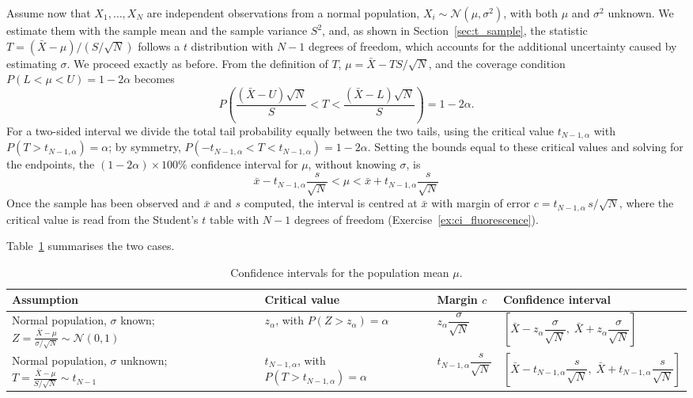 \documentclass[letterpaper,11pt,leqno]{book}
\begin{document}
Assume now that $X_1, \dots, X_N$ are independent observations from a normal population, $X_i \sim \mathcal{N}(\mu, \sigma^2)$, with both $\mu$ and $\sigma^2$ unknown. We estimate them with the sample mean and the sample variance $S^2$, and, as shown in Section~\ref{sec:t_sample}, the statistic $T = (\bar{X} - \mu)/(S/\sqrt{N})$ follows a $t$ distribution with $N - 1$ degrees of freedom, which accounts for the additional uncertainty caused by estimating $\sigma$. We proceed exactly as before. From the definition of $T$, $\mu = \bar{X} - TS/\sqrt{N}$, and the coverage condition $P(L < \mu < U) = 1 - 2\alpha$ becomes
\begin{equation*}
P\left(\frac{(\bar{X} - U)\sqrt{N}}{S} < T < \frac{(\bar{X} - L)\sqrt{N}}{S}\right) = 1 - 2\alpha.
\end{equation*}
For a two-sided interval we divide the total tail probability equally between the two tails, using the critical value $t_{N-1,\alpha}$ with $P(T > t_{N-1,\alpha}) = \alpha$; by symmetry, $P(-t_{N-1,\alpha} < T < t_{N-1,\alpha}) = 1 - 2\alpha$. Setting the bounds equal to these critical values and solving for the endpoints, the $(1 - 2\alpha) \times 100\%$ confidence interval for $\mu$, without knowing $\sigma$, is
\begin{equation}
\boxed{\bar{x} - t_{N-1,\alpha}\frac{s}{\sqrt{N}} < \mu < \bar{x} + t_{N-1,\alpha}\frac{s}{\sqrt{N}}}
\label{eq:ci_unknown_sigma}
\end{equation}
Once the sample has been observed and $\bar{x}$ and $s$ computed, the interval is centred at $\bar{x}$ with margin of error $c = t_{N-1,\alpha}\,s/\sqrt{N}$, where the critical value is read from the Student's $t$ table with $N - 1$ degrees of freedom (Exercise~\ref{ex:ci_fluorescence}).

Table~\ref{tab:ci_summary} summarises the two cases.

\begin{table}[!htbp]
\centering
\caption{Confidence intervals for the population mean $\mu$.}
\label{tab:ci_summary}
\begin{tabular*}{\textwidth}{p{3.9cm}@{\extracolsep\fill}p{2.9cm}p{1.9cm}p{4.3cm}}
\toprule
Assumption & Critical value & Margin $c$ & Confidence interval \\
\midrule
Normal population, $\sigma$ known; $Z = \frac{\bar{X} - \mu}{\sigma/\sqrt{N}} \sim \mathcal{N}(0, 1)$ & $z_\alpha$, with $P(Z > z_\alpha) = \alpha$ & $z_\alpha\dfrac{\sigma}{\sqrt{N}}$ & $\left[\bar{X} - z_\alpha\dfrac{\sigma}{\sqrt{N}},\; \bar{X} + z_\alpha\dfrac{\sigma}{\sqrt{N}}\right]$ \\[3ex]
Normal population, $\sigma$ unknown; $T = \frac{\bar{X} - \mu}{S/\sqrt{N}} \sim t_{N-1}$ & $t_{N-1,\alpha}$, with $P(T > t_{N-1,\alpha}) = \alpha$ & $t_{N-1,\alpha}\dfrac{s}{\sqrt{N}}$ & $\left[\bar{X} - t_{N-1,\alpha}\dfrac{s}{\sqrt{N}},\; \bar{X} + t_{N-1,\alpha}\dfrac{s}{\sqrt{N}}\right]$ \\
\bottomrule
\end{tabular*}
\end{table}
\end{document}
